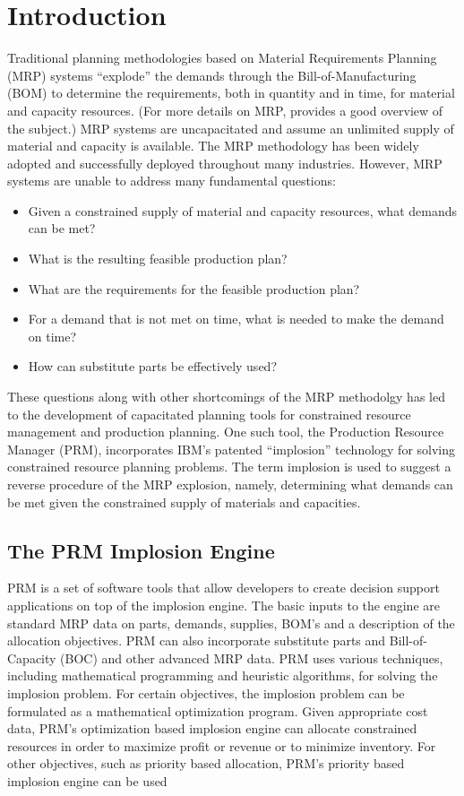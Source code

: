\section{Introduction}
Traditional planning methodologies based on Material Requirements
Planning (MRP) systems ``explode'' the demands through the
Bill-of-Manufacturing (BOM) to determine the requirements, both in
quantity and in time, for material and capacity resources.  (For more
details on MRP, \cite{orlicky} provides a good overview of the
subject.)  MRP systems are uncapacitated and assume an unlimited
supply of material and capacity is available.  The MRP methodology has
been widely adopted and successfully deployed throughout many
industries.  However, MRP systems are unable to address many
fundamental questions:
\begin{itemize}
\item Given a constrained supply of material and capacity resources, what
demands can be met?
\item What is the resulting feasible production plan?
\item What are the requirements for the feasible production plan?
\item For a demand that is not met on time, what is needed to make the 
demand on time?
\item How can substitute parts be effectively used?
\end{itemize}
These questions along with other shortcomings of the MRP methodolgy
has led to the development of capacitated planning tools for
constrained resource management and production planning.  One such
tool, the Production Resource Manager (PRM)\cite{PRM1}, incorporates
IBM's patented ``implosion'' technology for solving constrained
resource planning problems.  The term implosion is used to suggest a
reverse procedure of the MRP explosion, namely, determining what
demands can be met given the constrained supply of materials and
capacities.

\subsection{The PRM Implosion Engine}
PRM is a set of software tools that allow developers to create
decision support applications on top of the implosion engine.  The
basic inputs to the engine are standard MRP data on parts, demands,
supplies, BOM's and a description of the allocation objectives.  PRM
can also incorporate substitute parts and Bill-of-Capacity (BOC) and
other advanced MRP data.  PRM uses various techniques, including
mathematical programming and heuristic algorithms, for solving the
implosion problem.  For certain objectives, the implosion problem can
be formulated as a mathematical optimization program.  Given
appropriate cost data, PRM's optimization based implosion engine can
allocate constrained resources in order to maximize profit or revenue
or to minimize inventory.  For other objectives, such as priority
based allocation, PRM's priority based implosion engine can be used

